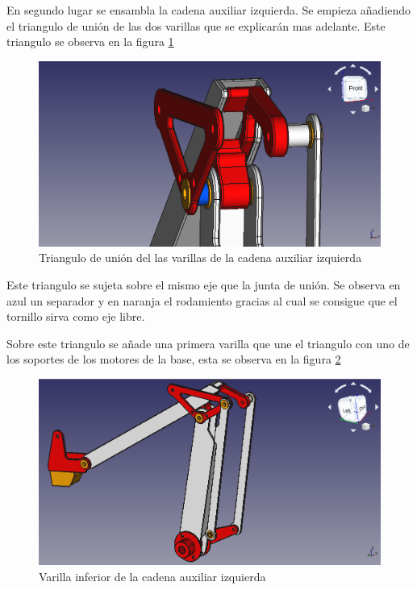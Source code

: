 En segundo lugar se ensambla la cadena auxiliar izquierda. Se empieza añadiendo el triangulo de unión de las dos varillas que se explicarán mas adelante. Este triangulo se observa en la figura \ref{fig:triangulo_union_varillas}

\begin{figure}[H]
    \centering 
    \includegraphics[width=1\linewidth]{pictures/TrianguloDeUnion.png}
    \caption{Triangulo de unión del las varillas de la cadena auxiliar izquierda}
    \label{fig:triangulo_union_varillas}
\end{figure}

Este triangulo se sujeta sobre el mismo eje que la junta de unión.
Se observa en azul un separador y en naranja el rodamiento gracias al cual se consigue que el tornillo sirva como eje libre.

Sobre este triangulo se añade una primera varilla que une el triangulo con uno de los soportes de los motores de la base, esta se observa en la figura \ref{fig:varilla_inferior_izquierda}

\begin{figure}[H]
    \centering 
    \includegraphics[width=1\linewidth]{pictures/VarillaInferior.png}
    \caption{Varilla inferior de la cadena auxiliar izquierda}
    \label{fig:varilla_inferior_izquierda}
\end{figure}

